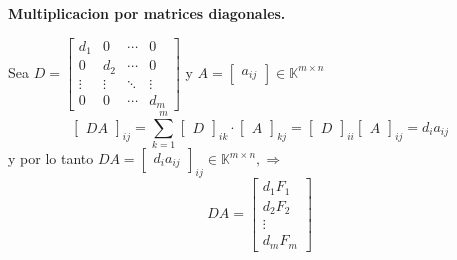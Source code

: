 \documentclass{article}
\theoremstyle{definition}
\theoremstyle{definition}
\theoremstyle{remark}
\begin{document}
\begin{center}
\textbf{Multiplicacion por matrices diagonales.}
\end{center}
Sea $D=\begin{bmatrix}d_1 & 0 & \cdots & 0  \\ 0 & d_2 & \cdots & 0 \\ \vdots & \vdots & \ddots & \vdots \\ 0 & 0 & \cdots & d_m \end{bmatrix}$ y $A=\begin{bmatrix}a_{ij}\end{bmatrix}\in \mathbb{K}^{m \times n}$ \[
\begin{bmatrix} DA \end{bmatrix}_{ij} = \sum_{k=1}^{m} \begin{bmatrix}D \end{bmatrix}_{ik} \cdot \begin{bmatrix}A \end{bmatrix}_{kj}=\begin{bmatrix} D \end{bmatrix}_{ii} \begin{bmatrix} A \end{bmatrix}_{ij} = d_i a_{ij}
\]
y por lo tanto $DA=\begin{bmatrix}d_ia_{ij} \end{bmatrix}_{ij} \in \mathbb{K}^{m \times n}, \Rightarrow$  \[
DA=\begin{bmatrix} d_1F_1 \\ d_2 F_2 \\ \vdots \\d_mF_m \end{bmatrix}
\]\pagebreak 
\end{document}
